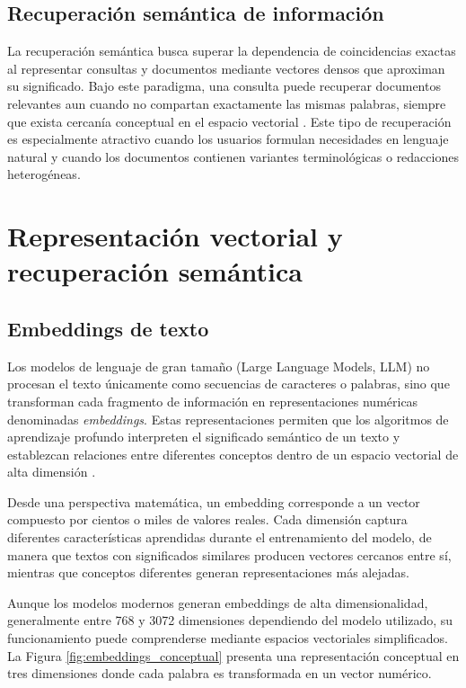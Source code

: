 \subsection{Recuperación semántica de información}

La recuperación semántica busca superar la dependencia de coincidencias exactas al representar consultas y documentos mediante vectores densos que aproximan su significado. Bajo este paradigma, una consulta puede recuperar documentos relevantes aun cuando no compartan exactamente las mismas palabras, siempre que exista cercanía conceptual en el espacio vectorial \parencite{reimers2019sentencebert, karpukhin2020dpr}. Este tipo de recuperación es especialmente atractivo cuando los usuarios formulan necesidades en lenguaje natural y cuando los documentos contienen variantes terminológicas o redacciones heterogéneas.

\section{Representación vectorial y recuperación semántica}

\subsection{Embeddings de texto}

Los modelos de lenguaje de gran tamaño (Large Language Models, LLM) no procesan el texto únicamente como secuencias de caracteres o palabras, sino que transforman cada fragmento de información en representaciones numéricas denominadas \textit{embeddings}. Estas representaciones permiten que los algoritmos de aprendizaje profundo interpreten el significado semántico de un texto y establezcan relaciones entre diferentes conceptos dentro de un espacio vectorial de alta dimensión \parencite{mikolov2013efficient,bommasani2021foundation}.

Desde una perspectiva matemática, un embedding corresponde a un vector compuesto por cientos o miles de valores reales. Cada dimensión captura diferentes características aprendidas durante el entrenamiento del modelo, de manera que textos con significados similares producen vectores cercanos entre sí, mientras que conceptos diferentes generan representaciones más alejadas.

Aunque los modelos modernos generan embeddings de alta dimensionalidad, generalmente entre 768 y 3072 dimensiones dependiendo del modelo utilizado, su funcionamiento puede comprenderse mediante espacios vectoriales simplificados. La Figura \ref{fig:embeddings_conceptual} presenta una representación conceptual en tres dimensiones donde cada palabra es transformada en un vector numérico.

